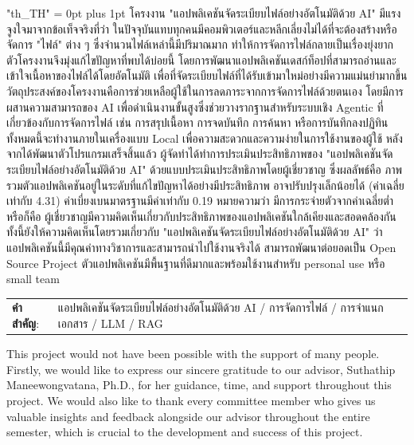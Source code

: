 \documentclass[12pt,oneside,openright,a4paper]{cpe-english-project}
\begin{document}
{
\XeTeXlinebreaklocale "th_TH"
\XeTeXlinebreakskip = 0pt plus 1pt
\thaifont
\thaiabstract
โครงงาน "แอปพลิเคชันจัดระเบียบไฟล์อย่างอัตโนมัติด้วย AI" มีแรงจูงใจมาจากข้อเท็จจริงที่ว่า ในปัจจุบันแทบทุกคนมีคอมพิวเตอร์และหลีกเลี่ยงไม่ได้ที่จะต้องสร้างหรือจัดการ "ไฟล์" ต่าง ๆ ซึ่งจำนวนไฟล์เหล่านี้มีปริมาณมาก ทำให้การจัดการไฟล์กลายเป็นเรื่องยุ่งยาก ตัวโครงงานจึงมุ่งแก้ไขปัญหาที่พบได้บ่อยนี้ โดยการพัฒนาแอปพลิเคชันเดสก์ท็อปที่สามารถอ่านและเข้าใจเนื้อหาของไฟล์ได้โดยอัตโนมัติ เพื่อที่จัดระเบียบไฟล์ที่ได้รับเข้ามาใหม่อย่างมีความแม่นยำมากขึ้น วัตถุประสงค์ของโครงงานคือการช่วยเหลือผู้ใช้ในการลดภาระจากการจัดการไฟล์ด้วยตนเอง โดยมีการผสานความสามารถของ AI เพื่อดำเนินงานขั้นสูงซึ่งช่วยวางรากฐานสำหรับระบบเชิง Agentic ที่เกี่ยวข้องกับการจัดการไฟล์ เช่น การสรุปเนื้อหา การจดบันทึก การค้นหา หรือการบันทึกลงปฏิทิน ทั้งหมดนี้จะทำงานภายในเครื่องแบบ Local เพื่อความสะดวกและความง่ายในการใช้งานของผู้ใช้ หลังจากได้พัฒนาตัวโปรแกรมเสร็จสิ้นแล้ว ผู้จัดทำได้ทำการประเมินประสิทธิภาพของ "แอปพลิเคชันจัดระเบียบไฟล์อย่างอัตโนมัติด้วย AI" ด้วยแบบประเมินประสิทธิภาพโดยผู้เชี่ยวชาญ ซึ่งผลลัพธ์คือ ภาพรวมตัวแอปพลิเคชันอยู่ในระดับที่แก้ไขปัญหาได้อย่างมีประสิทธิภาพ อาจปรับปรุงเล็กน้อยได้ (ค่าเฉลี่ยเท่ากับ 4.31) ค่าเบี่ยงเบนมาตรฐานมีค่าเท่ากับ 0.19 หมายความว่า มีการกระจ่ายตัวจากค่าเฉลี่ยต่ำ หรือก็คือ ผู้เชี่ยวชาญมีความคิดเห็นเกี่ยวกับประสิทธิภาพของแอปพลิเคชันใกล้เคียงและสอดคล้องกัน ทั้งนี้ยังให้ความคิดเห็นโดยรวมเกี่ยวกับ "แอปพลิเคชันจัดระเบียบไฟล์อย่างอัตโนมัติด้วย AI" ว่า แอปพลิเคชันนี้มีคุณค่าทางวิชาการและสามารถนำไปใช้งานจริงได้ สามารถพัฒนาต่อยอดเป็น Open Source Project ตัวแอปพลิเคชันมีพื้นฐานที่ดีมากและพร้อมใช้งานสำหรับ personal use หรือ small team

\begin{flushleft}
\begin{tabular*}{\textwidth}{@{}lp{}}
\textbf{คำสำคัญ}: & แอปพลิเคชันจัดระเบียบไฟล์อย่างอัตโนมัติด้วย AI / การจัดการไฟล์ / การจำแนกเอกสาร / LLM / RAG
\end{tabular*}
\end{flushleft}
\endabstract
}

\preface
This project would not have been possible with the support of many people. Firstly, we would like to express our sincere gratitude to our advisor, Suthathip Maneewongvatana, Ph.D., for her guidance, time, and support throughout this project. We would also like to thank every committee member who gives us valuable insights and feedback alongside our advisor throughout the entire semester, which is crucial to the development and success of this project.
\end{document}
